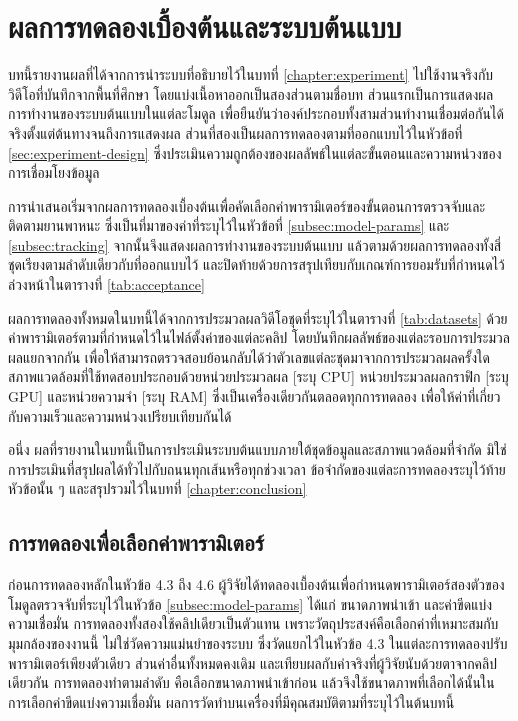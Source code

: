\chapter{ผลการทดลองเบื้องต้นและระบบต้นแบบ}
\label{chapter:results}

บทนี้รายงานผลที่ได้จากการนำระบบที่อธิบายไว้ในบทที่ \ref{chapter:experiment} ไปใช้งานจริงกับวิดีโอที่บันทึกจากพื้นที่ศึกษา โดยแบ่งเนื้อหาออกเป็นสองส่วนตามชื่อบท ส่วนแรกเป็นการแสดงผลการทำงานของระบบต้นแบบในแต่ละโมดูล เพื่อยืนยันว่าองค์ประกอบทั้งสามส่วนทำงานเชื่อมต่อกันได้จริงตั้งแต่ต้นทางจนถึงการแสดงผล ส่วนที่สองเป็นผลการทดลองตามที่ออกแบบไว้ในหัวข้อที่ \ref{sec:experiment-design} ซึ่งประเมินความถูกต้องของผลลัพธ์ในแต่ละขั้นตอนและความหน่วงของการเชื่อมโยงข้อมูล

การนำเสนอเริ่มจากผลการทดลองเบื้องต้นเพื่อคัดเลือกค่าพารามิเตอร์ของขั้นตอนการตรวจจับและติดตามยานพาหนะ ซึ่งเป็นที่มาของค่าที่ระบุไว้ในหัวข้อที่ \ref{subsec:model-params} และ \ref{subsec:tracking} จากนั้นจึงแสดงผลการทำงานของระบบต้นแบบ แล้วตามด้วยผลการทดลองทั้งสี่ชุดเรียงตามลำดับเดียวกับที่ออกแบบไว้ และปิดท้ายด้วยการสรุปเทียบกับเกณฑ์การยอมรับที่กำหนดไว้ล่วงหน้าในตารางที่ \ref{tab:acceptance}

ผลการทดลองทั้งหมดในบทนี้ได้จากการประมวลผลวิดีโอชุดที่ระบุไว้ในตารางที่ \ref{tab:datasets} ด้วยค่าพารามิเตอร์ตามที่กำหนดไว้ในไฟล์ตั้งค่าของแต่ละคลิป โดยบันทึกผลลัพธ์ของแต่ละรอบการประมวลผลแยกจากกัน เพื่อให้สามารถตรวจสอบย้อนกลับได้ว่าตัวเลขแต่ละชุดมาจากการประมวลผลครั้งใด สภาพแวดล้อมที่ใช้ทดสอบประกอบด้วยหน่วยประมวลผล [ระบุ CPU] หน่วยประมวลผลกราฟิก [ระบุ GPU] และหน่วยความจำ [ระบุ RAM] ซึ่งเป็นเครื่องเดียวกันตลอดทุกการทดลอง เพื่อให้ค่าที่เกี่ยวกับความเร็วและความหน่วงเปรียบเทียบกันได้

อนึ่ง ผลที่รายงานในบทนี้เป็นการประเมินระบบต้นแบบภายใต้ชุดข้อมูลและสภาพแวดล้อมที่จำกัด มิใช่การประเมินที่สรุปผลได้ทั่วไปกับถนนทุกเส้นหรือทุกช่วงเวลา ข้อจำกัดของแต่ละการทดลองระบุไว้ท้ายหัวข้อนั้น ๆ และสรุปรวมไว้ในบทที่ \ref{chapter:conclusion}

\section{การทดลองเพื่อเลือกค่าพารามิเตอร์}
\label{sec:param-selection}

ก่อนการทดลองหลักในหัวข้อ 4.3 ถึง 4.6 ผู้วิจัยได้ทดลองเบื้องต้นเพื่อกำหนดพารามิเตอร์สองตัวของโมดูลตรวจจับที่ระบุไว้ในหัวข้อ \ref{subsec:model-params} ได้แก่ ขนาดภาพนำเข้า และค่าขีดแบ่งความเชื่อมั่น การทดลองทั้งสองใช้คลิปเดียวเป็นตัวแทน เพราะวัตถุประสงค์คือเลือกค่าที่เหมาะสมกับมุมกล้องของงานนี้ ไม่ใช่วัดความแม่นยำของระบบ ซึ่งวัดแยกไว้ในหัวข้อ 4.3 ในแต่ละการทดลองปรับพารามิเตอร์เพียงตัวเดียว ส่วนค่าอื่นทั้งหมดคงเดิม และเทียบผลกับค่าจริงที่ผู้วิจัยนับด้วยตาจากคลิปเดียวกัน การทดลองทำตามลำดับ คือเลือกขนาดภาพนำเข้าก่อน แล้วจึงใช้ขนาดภาพที่เลือกได้นั้นในการเลือกค่าขีดแบ่งความเชื่อมั่น ผลการวัดทำบนเครื่องที่มีคุณสมบัติตามที่ระบุไว้ในต้นบทนี้

